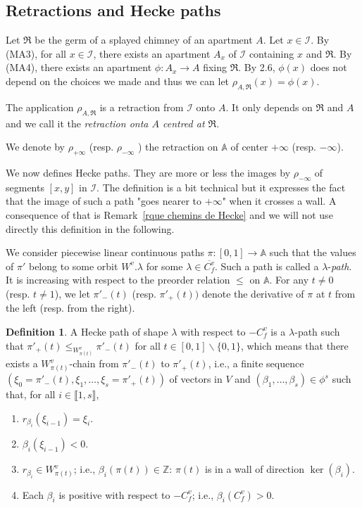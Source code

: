 \documentclass[12pt]{article}
\theoremstyle{plain}
\theoremstyle{definition}
\newtheorem{defn}[thm]{Definition}
\newcommand{\A}{\mathbb{A}}
\newcommand{\Z}{\mathbb{Z}}
\newcommand{\I}{\mathcal{I}}
\begin{document}
\subsection{Retractions and Hecke paths}


Let  $\mathfrak{R}$ be the germ of a splayed chimney of an apartment $A$. Let $x\in \I$. By (MA3), for all $x\in \I$, there exists an apartment $A_x$ of $\I$ containing $x$ and $\mathfrak{R}$. By (MA4), there exists an apartment $\phi:A_x\rightarrow A$ fixing $\mathfrak{R}$. By \cite{rousseau2011masures} 2.6, $\phi(x)$ does not depend on the choices we made and thus we can let $\rho_{A,\mathfrak{R}}(x)=\phi(x)$.

The application $\rho_{A,\mathfrak{R}}$ is a retraction from $\I$ onto $A$. It only depends on $\mathfrak{R}$ and $A$ and we call it the \textit{retraction onta $A$ centred at $\mathfrak{R}$}. 

We denote by $\rho_{+\infty}$ (resp. $\rho_{-\infty}$ ) the retraction on $\A$ of center $+\infty$ (resp. $-\infty$).

We now defines Hecke paths. They are more or less the images by $\rho_{-\infty}$ of segments $[x,y]$ in $\I$. The definition is a bit technical but it expresses the fact that the image of such a path "goes nearer to $+\infty$" when it crosses a wall. A consequence of that is Remark~\ref{rque chemins de Hecke} and we will not use directly this definition in the following.

 We consider piecewise linear continuous paths $\pi:[0,1]\rightarrow \A$ such that the values  of $\pi'$ belong to some orbit $W^v.\lambda$ for some $\lambda\in \overline{C_f^v}$. Such a path is called a $\lambda$-\textit{path}. It is increasing with respect to the preorder relation $\leq$ on $\A$. For any $t\neq 0$ (resp. $t\neq 1$), we let $\pi'_-(t)$ (resp. $\pi'_+(t))$ denote the derivative of $\pi$ at $t$ from the left (resp. from the right).

\begin{defn}
A Hecke path of shape $\lambda$ with respect to $-C_f^v$ is a $\lambda$-path such that
 $\pi'_+(t)\leq_{W^v_{\pi (t)}} \pi'_-(t)$ for all $t\in [0,1]\backslash \{0,1\}$, which 
 means that there exists a $W_{\pi(t)}^v$-chain from $\pi'_-(t)$ to $\pi'_{+}(t)$, i.e., a 
 finite sequence $(\xi_0=\pi'_-(t),\xi_1,\ldots, \xi_s=\pi'_+(t))$ of vectors in $V$ and
  $(\beta_1,\ldots,\beta_s)\in \phi^s$ such that, for all $i\in \llbracket 1,s\rrbracket$,
\begin{enumerate}
\item $r_{\beta_i}(\xi_{i-1})=\xi_i.$

\item $\beta_i(\xi_{i-1})<0.$

\item $r_{\beta_i}\in W^v_{\pi(t)}$; i.e., $\beta_i(\pi(t))\in \Z$: $\pi(t)$ is in a wall of direction $\ker(\beta_i)$.

\item Each $\beta_i$ is positive with respect to $-C_f^v$; i.e., $\beta_i(C_f^v)>0$.
\end{enumerate}
\end{defn}
\end{document}

